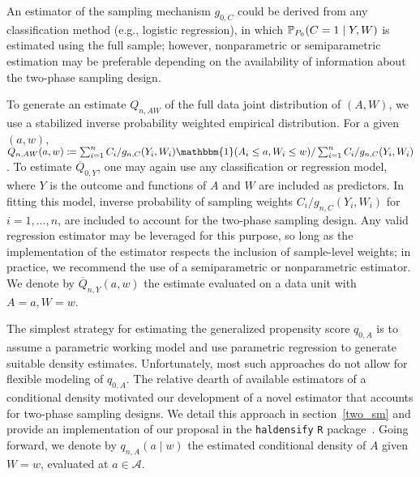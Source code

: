An estimator of the sampling mechanism $g_{0,C}$ could be derived from any
classification method (e.g., logistic regression), in which $\mathbb{P}_{P_0}(C
= 1 \mid Y, W)$ is estimated using the full sample; however, nonparametric or
semiparametric estimation may be preferable depending on the availability of
information about the two-phase sampling design.

To generate an estimate $Q_{n,AW}$ of the full data joint distribution of
$(A,W)$, we use a stabilized inverse probability weighted empirical
distribution. For a given $(a,w)$,  $Q_{n,AW}(a,w) \coloneqq \sum_{i=1}^n C_i/
g_{n,C}(Y_i, W_i) \mathbbm{1}(A_i \le a, W_i \le w) / \sum_{i=1}^n
C_i/g_{n,C}(Y_i,W_i)$. To estimate $\overline{Q}_{0,Y}$, one may again use any
classification or regression model, where $Y$ is the outcome and functions of
$A$ and $W$ are included as predictors. In fitting this model, inverse
probability of sampling weights $C_i / g_{n, C} (Y_i, W_i)$ for $i=1, \ldots,
n$, are included to account for the two-phase sampling design. Any valid
regression estimator may be leveraged for this purpose, so long as the
implementation of the estimator respects the inclusion of sample-level weights;
in practice, we recommend the use of a semiparametric or nonparametric
estimator. We denote by $\overline{Q}_{n,Y}(a,w)$ the estimate evaluated on
a data unit with $A = a, W = w$.

The simplest strategy for estimating the generalized propensity score $q_{0,A}$
is to assume a parametric working model and use parametric regression to
generate suitable density estimates. Unfortunately, most such approaches do not
allow for flexible modeling of $q_{0,A}$.
The relative dearth of available estimators of a conditional density motivated
our development of a novel estimator that accounts for two-phase sampling
designs. We detail this approach in section~\ref{two_sm} and
provide an implementation of our proposal in the \texttt{haldensify} \texttt{R}
package~\citep{hejazi2021haldensify}. Going forward, we denote by $q_{n,A}(a
\mid w)$ the estimated conditional density of $A$ given $W = w$, evaluated at
$a \in \mathcal{A}$.

